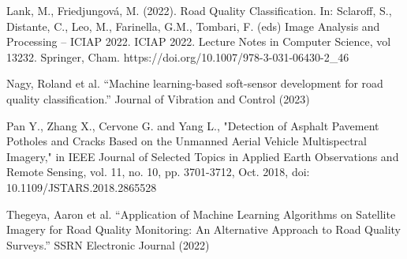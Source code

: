 \documentclass{article}
\begin{document}
{Lank, M., Friedjungová, M. (2022). Road Quality Classification. In: Sclaroff, S., Distante, C., Leo, M., Farinella, G.M., Tombari, F. (eds) Image Analysis and Processing – ICIAP 2022. ICIAP 2022. Lecture Notes in Computer Science, vol 13232. Springer, Cham. https://doi.org/10.1007/978-3-031-06430-2\_46

Nagy, Roland et al. “Machine learning-based soft-sensor development for road quality classification.” Journal of Vibration and Control (2023)

Pan Y.,  Zhang X., Cervone G.  and Yang L., "Detection of Asphalt Pavement Potholes and Cracks Based on the Unmanned Aerial Vehicle Multispectral Imagery," in IEEE Journal of Selected Topics in Applied Earth Observations and Remote Sensing, vol. 11, no. 10, pp. 3701-3712, Oct. 2018, doi: 10.1109/JSTARS.2018.2865528

Thegeya, Aaron et al. “Application of Machine Learning Algorithms on Satellite Imagery for Road Quality Monitoring: An Alternative Approach to Road Quality Surveys.” SSRN Electronic Journal (2022)


}

\end{document}
